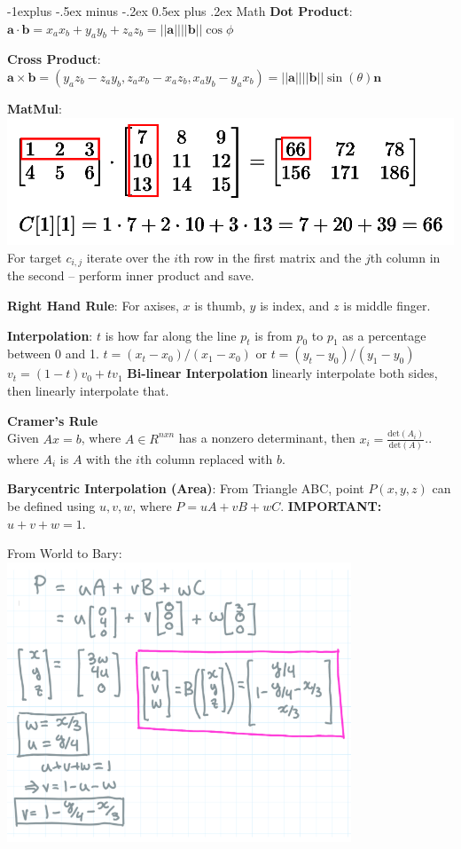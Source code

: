 \documentclass[letterpaper, 8pt]{extarticle}
\makeatletter
\renewcommand{\section}{\@startsection{section}{1}{0mm}%
                                {-1explus -.5ex minus -.2ex}%
                                {0.5ex plus .2ex}%
                                {\normalfont\small\bfseries}}
\makeatother
\begin{document}
\begin{multicols*}{4}

\section{Math}
\textbf{Dot Product}:
\(
\mathbf{a} \cdot \mathbf{b}
= x_a x_b + y_a y_b + z_a z_b
= ||\mathbf{a}|| ||\mathbf{b}|| \cos \phi
\)

\textbf{Cross Product}:
\(
\mathbf{a} \times \mathbf{b}
= (y_a z_b - z_a y_b, z_a x_b - x_a z_b, x_a y_b - y_a x_b)
= ||\mathbf{a}|| ||\mathbf{b}|| \sin(\theta) \mathbf{n}
\)

\textbf{MatMul}:\\
\includegraphics[width=0.5\linewidth]{matrix-multiply-a.png}
For target $c_{i,j}$ iterate over the $i$th row in the first matrix and the $j$th column in the second -- perform inner product and save.

\textbf{Right Hand Rule}:
For axises, $x$ is thumb, $y$ is index, and $z$ is middle finger.

\textbf{Interpolation}:
\(t\) is how far along the line \(p_t\) is from \(p_0\) to \(p_1\) as a percentage between 0 and 1.
\(
t = (x_t - x_0) / (x_1 - x_0)
\text{ or }
t = (y_t - y_0) / (y_1 - y_0)
\)
\(
v_t = (1-t) v_0 + t v_1
\)
% 
\textbf{Bi-linear Interpolation}
linearly interpolate both sides, then linearly interpolate that.

\textbf{Cramer's Rule} \\
Given $Ax=b$, where $A \in R^{nxn}$ has a nonzero determinant, then $x_i = \frac{\text{det}(A_i)}{\text{det}(A)}$.. where $A_i$ is $A$ with the $i$th column replaced with $b$.

\textbf{Barycentric Interpolation (Area)}:
From Triangle ABC, point $P(x,y,z)$ can be defined using $u,v,w$, where $P = uA + vB + wC$. \textbf{IMPORTANT:} $u + v + w = 1$.

From World to Bary: 
\includegraphics[width=0.8\linewidth]{bary-transform.png}



\end{multicols*}
\end{document}
